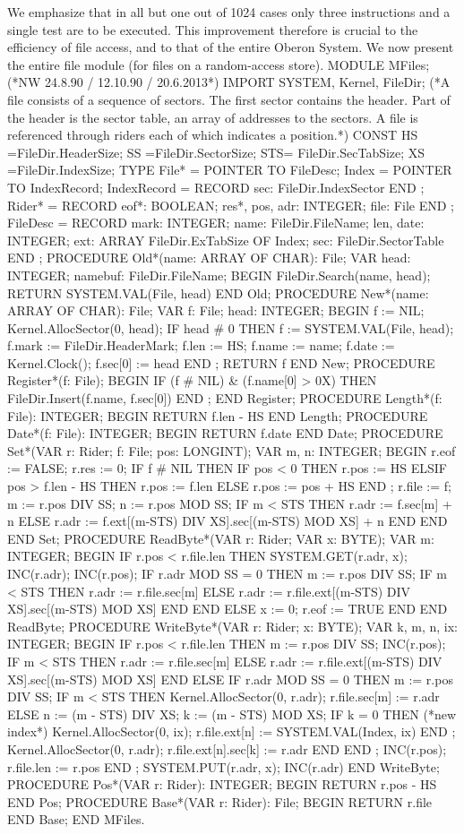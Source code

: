 \noindent We emphasize that in all but one out of 1024 cases only three instructions and a single test are to be executed. This improvement therefore is crucial to the efficiency of file access, and to that of the entire Oberon System. We now present the entire file module (for files on a random-access store).
\begintt
MODULE MFiles; (*NW 24.8.90 / 12.10.90 / 20.6.2013*)
IMPORT SYSTEM, Kernel, FileDir;
(*A file consists of a sequence of sectors. The first sector contains the header.
Part of the header is the sector table, an array of addresses to the sectors. A file is referenced through riders each of which indicates a position.*)
CONST
HS =FileDir.HeaderSize; SS =FileDir.SectorSize; STS= FileDir.SecTabSize; XS =FileDir.IndexSize;
TYPE File* = POINTER TO FileDesc;
Index = POINTER TO IndexRecord;
IndexRecord = RECORD sec: FileDir.IndexSector END ;
Rider* =
RECORD eof*: BOOLEAN;
res*, pos, adr: INTEGER;
file: File END ;
FileDesc =
RECORD mark: INTEGER;
name: FileDir.FileName;
len, date: INTEGER;
ext: ARRAY FileDir.ExTabSize OF Index;
sec: FileDir.SectorTable END ;
PROCEDURE Old*(name: ARRAY OF CHAR): File; VAR head: INTEGER;
namebuf: FileDir.FileName; BEGIN
FileDir.Search(name, head); RETURN SYSTEM.VAL(File, head) END Old;
PROCEDURE New*(name: ARRAY OF CHAR): File; VAR f: File; head: INTEGER;
BEGIN f := NIL; Kernel.AllocSector(0, head); IF head # 0 THEN
f := SYSTEM.VAL(File, head); f.mark := FileDir.HeaderMark; f.len := HS; f.name := name;
f.date := Kernel.Clock(); f.sec[0] := head
END ;
RETURN f END New;
PROCEDURE Register*(f: File); BEGIN
IF (f # NIL) & (f.name[0] > 0X) THEN FileDir.Insert(f.name, f.sec[0]) END ; END Register;
PROCEDURE Length*(f: File): INTEGER; BEGIN RETURN f.len - HS
END Length;
PROCEDURE Date*(f: File): INTEGER; BEGIN RETURN f.date
END Date;
PROCEDURE Set*(VAR r: Rider; f: File; pos: LONGINT); VAR m, n: INTEGER;
BEGIN r.eof := FALSE; r.res := 0; IF f # NIL THEN
IF pos < 0 THEN r.pos := HS
ELSIF pos > f.len - HS THEN r.pos := f.len
ELSE r.pos := pos + HS
END ;
r.file := f; m := r.pos DIV SS; n := r.pos MOD SS;
IF m < STS THEN r.adr := f.sec[m] + n
ELSE r.adr := f.ext[(m-STS) DIV XS].sec[(m-STS) MOD XS] + n END
END END Set;
PROCEDURE ReadByte*(VAR r: Rider; VAR x: BYTE); VAR m: INTEGER;
BEGIN
IF r.pos < r.file.len THEN
SYSTEM.GET(r.adr, x); INC(r.adr); INC(r.pos); IF r.adr MOD SS = 0 THEN
m := r.pos DIV SS;
IF m < STS THEN r.adr := r.file.sec[m]
ELSE r.adr := r.file.ext[(m-STS) DIV XS].sec[(m-STS) MOD XS] END
END
ELSE x := 0; r.eof := TRUE END
END ReadByte;
PROCEDURE WriteByte*(VAR r: Rider; x: BYTE); VAR k, m, n, ix: INTEGER;
BEGIN
IF r.pos < r.file.len THEN
m := r.pos DIV SS; INC(r.pos);
IF m < STS THEN r.adr := r.file.sec[m]
ELSE r.adr := r.file.ext[(m-STS) DIV XS].sec[(m-STS) MOD XS] END
ELSE
IF r.adr MOD SS = 0 THEN
m := r.pos DIV SS;
IF m < STS THEN Kernel.AllocSector(0, r.adr); r.file.sec[m] := r.adr ELSE n := (m - STS) DIV XS; k := (m - STS) MOD XS;
IF k = 0 THEN (*new index*)
Kernel.AllocSector(0, ix); r.file.ext[n] := SYSTEM.VAL(Index, ix)
END ;
Kernel.AllocSector(0, r.adr); r.file.ext[n].sec[k] := r.adr END
END ;
INC(r.pos); r.file.len := r.pos END ;
SYSTEM.PUT(r.adr, x); INC(r.adr) END WriteByte;
PROCEDURE Pos*(VAR r: Rider): INTEGER; BEGIN RETURN r.pos - HS
END Pos;
PROCEDURE Base*(VAR r: Rider): File; BEGIN RETURN r.file
END Base;
END MFiles.
\endtt

